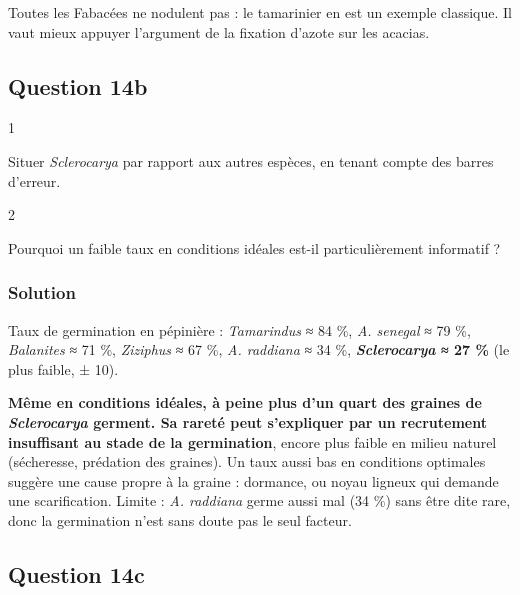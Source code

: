\documentclass[11pt,a4paper]{article}
\begin{document}
\begin{piege}

Toutes les Fabacées ne nodulent pas : le tamarinier en est un exemple classique. Il vaut mieux appuyer l'argument de la fixation d'azote sur les acacias.

\end{piege}

\hypertarget{question-14b}{%
\subsection{Question 14b}\label{question-14b}}

\begin{indication}{1}

Situer \emph{Sclerocarya} par rapport aux autres espèces, en tenant compte des barres d'erreur.

\end{indication}

\begin{indication}{2}

Pourquoi un faible taux en conditions idéales est-il particulièrement informatif ?

\end{indication}

\hypertarget{solution-38}{%
\subsubsection{Solution}\label{solution-38}}

Taux de germination en pépinière : \emph{Tamarindus} ≈ 84 \%, \emph{A. senegal} ≈ 79 \%, \emph{Balanites} ≈ 71 \%, \emph{Ziziphus} ≈ 67 \%, \emph{A. raddiana} ≈ 34 \%, \textbf{\emph{Sclerocarya} ≈ 27 \%} (le plus faible, ± 10).

\textbf{Même en conditions idéales, à peine plus d'un quart des graines de \emph{Sclerocarya} germent. Sa rareté peut s'expliquer par un recrutement insuffisant au stade de la germination}, encore plus faible en milieu naturel (sécheresse, prédation des graines). Un taux aussi bas en conditions optimales suggère une cause propre à la graine : dormance, ou noyau ligneux qui demande une scarification. Limite : \emph{A. raddiana} germe aussi mal (34 \%) sans être dite rare, donc la germination n'est sans doute pas le seul facteur.

\hypertarget{question-14c}{%
\subsection{Question 14c}\label{question-14c}}
\end{document}
